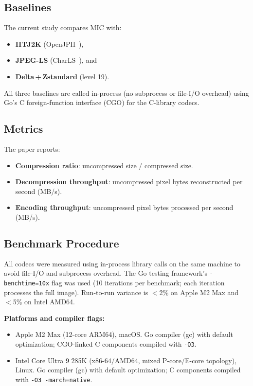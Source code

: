 \documentclass[journal]{IEEEtran}
\begin{document}
\subsection{Baselines}

The current study compares MIC with:
\begin{itemize}
  \item \textbf{HTJ2K} (OpenJPH~\cite{openjph}),
  \item \textbf{JPEG-LS} (CharLS~\cite{charls}), and
  \item \textbf{Delta\,+\,Zstandard} (level 19).
\end{itemize}

All three baselines are called in-process (no subprocess or file-I/O overhead)
using Go's C foreign-function interface (CGO) for the C-library codecs.

\subsection{Metrics}

The paper reports:
\begin{itemize}
  \item \textbf{Compression ratio}: uncompressed size / compressed size.
  \item \textbf{Decompression throughput}: uncompressed pixel bytes
  reconstructed per second (MB/s).
  \item \textbf{Encoding throughput}: uncompressed pixel bytes processed per
  second (MB/s).
\end{itemize}

\subsection{Benchmark Procedure}

All codecs were measured using in-process library calls on the same machine to
avoid file-I/O and subprocess overhead. The Go testing framework's
\texttt{-benchtime=10x} flag was used (10 iterations per benchmark; each
iteration processes the full image). Run-to-run variance is $<$2\% on Apple
M2 Max and $<$5\% on Intel AMD64.

\textbf{Platforms and compiler flags:}
\begin{itemize}
  \item Apple M2 Max (12-core ARM64), macOS. Go compiler (gc) with default
  optimization; CGO-linked C components compiled with \texttt{-O3}.
  \item Intel Core Ultra 9 285K (x86-64/AMD64, mixed P-core/E-core topology),
  Linux. Go compiler (gc) with default optimization; C components compiled
  with \texttt{-O3 -march=native}.
\end{itemize}
\end{document}
